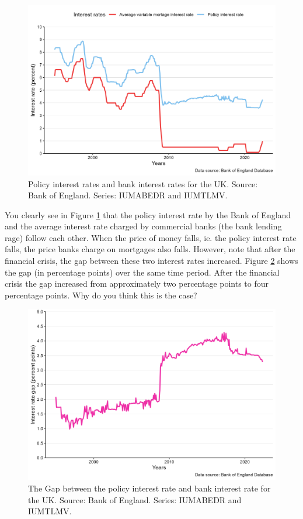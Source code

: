 \documentclass[
]{book}
\begin{document}
\begin{figure}

{\centering \includegraphics[width=0.7\linewidth]{./resources/chapter_money/ex4_2} 

}

\caption{Policy interest rates and bank interest rates for the UK. Source: Bank of England. Series: IUMABEDR and IUMTLMV.}\label{fig:money1}
\end{figure}

You clearly see in Figure \ref{fig:money1} that the policy interest rate by the Bank of England and the average interest rate charged by commercial banks (the bank lending rage) follow each other. When the price of money falls, ie. the policy interest rate falls, the price banks charge on mortgages also falls. However, note that after the financial crisis, the gap between these two interest rates increased. Figure \ref{fig:money2} shows the gap (in percentage points) over the same time period. After the financial crisis the gap increased from approximately two percentage points to four percentage points. Why do you think this is the case?

\begin{figure}

{\centering \includegraphics[width=0.7\linewidth]{./resources/chapter_money/ex4_3} 

}

\caption{The Gap between the policy interest rate and bank interest rate for the UK. Source: Bank of England. Series: IUMABEDR and IUMTLMV.}\label{fig:money2}
\end{figure}
\end{document}
